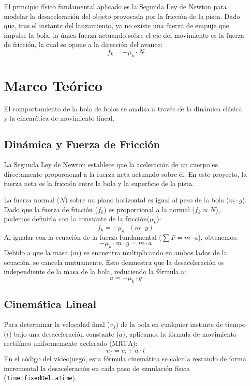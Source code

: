 \documentclass[11pt,letterpaper,twocolumn]{article}
\begin{document}
El principio físico fundamental aplicado es la Segunda Ley de Newton para modelar la desaceleración del objeto provocada por la fricción de la pista. Dado que, tras el instante del lanzamiento, ya no existe una fuerza de empuje que impulse la bola, la única fuerza actuando sobre el eje del movimiento es la fuerza de fricción, la cual se opone a la dirección del avance:
\begin{equation}
    f_k = -\mu_k \cdot N
\end{equation}
\section{Marco Teórico}
El comportamiento de la bola de bolos se analiza a través de la dinámica clásica y la cinemática de movimiento lineal.

\subsection{Dinámica y Fuerza de Fricción}
La Segunda Ley de Newton establece que la aceleración de un cuerpo es directamente proporcional a la fuerza neta actuando sobre él. En este proyecto, la fuerza neta es la fricción entre la bola y la superficie de la pista.

La fuerza normal ($N$) sobre un plano horizontal es igual al peso de la bola ($m \cdot g$). Dado que la fuerza de fricción ($f_k$) es proporcional a la normal ($f_k \propto N$), podemos definirla con la constante de la fricción($\mu_k$):
\begin{equation}
    f_k = -\mu_k \cdot (m \cdot g)
\end{equation}
Al igualar con la ecuación de la fuerza fundamental ($\sum F = m \cdot a$), obtenemos:
\begin{equation}
    -\mu_k \cdot m \cdot g = m \cdot a
\end{equation}
Debido a que la masa ($m$) se encuentra multiplicando en ambos lados de la ecuación, se cancela mutuamente. Esto demuestra que la desaceleración es independiente de la masa de la bola, reduciendo la fórmula a:
\begin{equation}
    a = -\mu_k \cdot g
\end{equation}

\subsection{Cinemática Lineal}
Para determinar la velocidad final ($v_f$) de la bola en cualquier instante de tiempo ($t$) bajo una desaceleración constante ($a$), aplicamos la fórmula de movimiento rectilíneo uniformemente acelerado (MRUA):
\begin{equation}
    v_f = v_i + a \cdot t
\end{equation}
En el código del videojuego, esta fórmula cinemática se calcula restando de forma incremental la desaceleración en cada paso de simulación física (\texttt{Time.fixedDeltaTime}).
\end{document}
